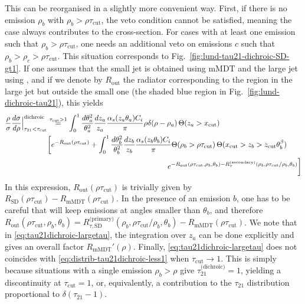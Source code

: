 This can be reorganised in a slightly more convenient way.
%
First, if there is no emission $\rho_b$ with $\rho_b>\rho\tau_\text{cut}$, the
veto condition cannot be satisfied, meaning the case always
contributes to the cross-section.
%
For cases with at least one emission such that $\rho_b>\rho\tau_\text{cut}$, one
needs an additional veto on emissions $c$ such that
$\rho_b>\rho_c>\rho\tau_\text{cut}$.
%
This situation corresponds to
Fig.~\ref{fig:lund-tau21-dichroic-SD-gt1}.
%
If one assumes that the small jet is obtained using mMDT and the large
jet using \SD, and if we denote by $R_\text{out}$ the radiator
corresponding to the region in the large jet but outside the small one
(\ie the shaded blue region in Fig.~\ref{fig:lund-dichroic-tau21}),
this yields
\begin{align}\label{eq:tau21dichroic-largetau}
  \frac{\rho}{\sigma} \frac{d\sigma}{d\rho}\Big|_{\tau_{21}<\tau_\text{cut}}^\text{dichroic}&
    \overset{\tau_\text{cut}>1}{=}
  \int_0^1 \frac{d\theta_a^2}{\theta_a^2}\frac{dz_a}{z_a}
  \frac{\alpha_s(z_a\theta_a)C_i}{\pi}\rho\delta(\rho-\rho_a)
  \,\Theta(z_a>x_\text{cut})\\
  &\bigg[ e^{-R_\text{out}(\rho\tau_\text{cut})}+\int_0^1 \frac{d\theta_b^2}{\theta_b^2}\frac{dz_b}{z_b}
  \frac{\alpha_s(z_b\theta_b)C_i}{\pi}\Theta(\rho_b>\rho\tau_\text{cut})
  \,\Theta(x_\text{cut}>z_b>\zcut\theta_b^\beta)\nonumber\\
  & \phantom{e^{-R_\text{out}(\rho\tau_\text{cut})}+\int_0^1 \frac{d\theta_b^2}{\theta_b^2}\frac{dz_b}{z_b}\frac{\alpha_s(z_b\theta_b)C_i}{\pi}}
  e^{-R_{\text{out}}(\rho\tau_\text{cut},\rho_b,\theta_b)-R_\tau^\text{(secondary)}(\rho_b,\rho\tau_\text{cut}/\rho_b,\theta_b)}\bigg]\nonumber
\end{align}
In this expression, $R_\text{out}(\rho\tau_\text{cut})$ is trivially
given by
$R_\text{SD}(\rho\tau_\text{cut})-R_\text{mMDT}(\rho\tau_\text{cut})$.
%
In the presence of an emission $b$, one has to be careful that \SD
will keep emissions at angles smaller than $\theta_b$, and therefore
$R_{\text{out}}(\rho\tau_\text{cut},\rho_b,\theta_b)=R_{\tau,\text{SD}}^{\text{(primary)}}(\rho_b,\rho\tau_\text{cut}/\rho_b,\theta_b)-R_\text{mMDT}(\rho\tau_\text{cut})$.
We note that in \eqref{eq:tau21dichroic-largetau}, the integration
over $z_a$ can be done explicitly and gives an overall factor
$R_\text{mMDT}'(\rho)$.
%
Finally, \eqref{eq:tau21dichroic-largetau} does not coincides with
\eqref{eq:distrib-tau21dichroic-less1} when $\tau_\text{cut}\to
1$. This is simply because situations with a single emission
$\rho_b>\rho$ give $\tau_{21}^\text{(dichroic)}=1$, yielding a
discontinuity at $\tau_\text{cut}=1$, or, equivalently, a contribution
to the $\tau_{21}$ distribution proportional to $\delta(\tau_{21}-1)$.


